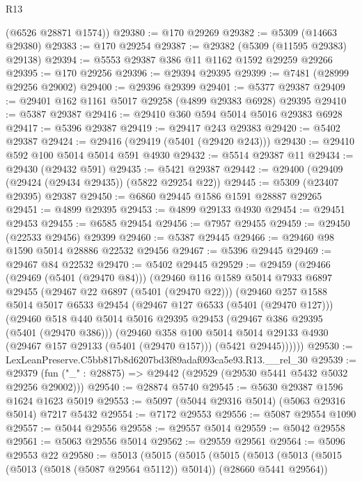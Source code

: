 \begin{lexlean}{R13}
\begin{coremodule}
      (@6526 @28871 @1574))
@29380 := @170 @29269
@29382 := @5309 (@14663 @29380)
@29383 := @170 @29254
@29387 := @29382 (@5309 (@11595 @29383) @29138)
@29394 := @5553 @29387 @386 @11 @1162 @1592 @29259 @29266
@29395 := @170 @29256
@29396 := @29394 @29395
@29399 := @7481 (@28999 @29256 @29002)
@29400 := @29396 @29399
@29401 := @5377 @29387
@29409 := @29401 @162 @1161 @5017 @29258 (@4899 @29383 @6928) @29395
@29410 := @5387 @29387
@29416 := @29410 @360 @594 @5014 @5016 @29383 @6928
@29417 := @5396 @29387
@29419 := @29417 @243 @29383
@29420 := @5402 @29387
@29424 := @29416 (@29419 (@5401 (@29420 @243)))
@29430 := @29410 @592 @100 @5014 @5014 @591 @4930
@29432 := @5514 @29387 @11
@29434 := @29430 (@29432 @591)
@29435 := @5421 @29387
@29442 := @29400 (@29409 (@29424 (@29434 @29435)) (@5822 @29254 @22))
@29445 := @5309 (@23407 @29395) @29387
@29450 := @6860 @29445 @1586 @1591 @28887 @29265
@29451 := @4899 @29395
@29453 := @4899 @29133 @4930
@29454 := @29451 @29453
@29455 := @6585 @29454
@29456 := @7957 @29455
@29459 := @29450 (@22533 @29456) @29399
@29460 := @5387 @29445
@29466 := @29460 @98 @1590 @5014 @28886 @22532 @29456
@29467 := @5396 @29445
@29469 := @29467 @84 @22532
@29470 := @5402 @29445
@29529 := @29459
    (@29466
      (@29469 (@5401 (@29470 @84)))
      (@29460
        @116
        @1589
        @5014
        @7933
        @6897
        @29455
        (@29467 @22 @6897 (@5401 (@29470 @22)))
        (@29460
          @257
          @1588
          @5014
          @5017
          @6533
          @29454
          (@29467 @127 @6533 (@5401 (@29470 @127)))
          (@29460
            @518
            @440
            @5014
            @5016
            @29395
            @29453
            (@29467 @386 @29395 (@5401 (@29470 @386)))
            (@29460
              @358
              @100
              @5014
              @5014
              @29133
              @4930
              (@29467 @157 @29133 (@5401 (@29470 @157)))
              (@5421 @29445))))))
@29530 := LexLeanPreserve.C5bb817b8d6207bd3f89adaf093ca5e93.R13.__rel_30
@29539 := @29379 (fun ("_" : @28875) => @29442 (@29529 (@29530 @5441 @5432 @5032 @29256 @29002)))
@29540 := @28874 @5740
@29545 := @5630 @29387 @1596 @1624 @1623 @5019
@29553 := @5097 (@5044 @29316 @5014) (@5063 @29316 @5014) @7217 @5432
@29554 := @7172 @29553
@29556 := @5087 @29554 @1090
@29557 := @5044 @29556
@29558 := @29557 @5014
@29559 := @5042 @29558
@29561 := @5063 @29556 @5014
@29562 := @29559 @29561
@29564 := @5096 @29553 @22
@29580 := @5013
    (@5015
      (@5015
        (@5015
          (@5013
            (@5013 (@5015 (@5013 (@5018 (@5087 @29564 @5112)) @5014)) (@28660 @5441 @29564))

\end{coremodule}
\end{lexlean}
